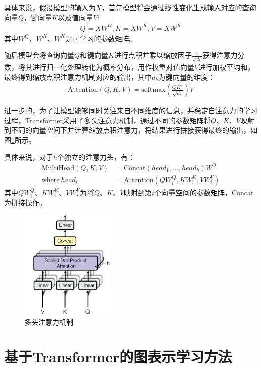 具体来说，假设模型的输入为$X$，首先模型将会通过线性变化生成输入对应的查询向量$Q$，键向量$K$以及值向量$V$:
\begin{gather}
    Q=XW^Q, K=XW^K, V=XW^K
\end{gather}
其中$W^Q$、$W^K$、$W^K$是可学习的参数矩阵。

随后模型会将查询向量$Q$和键向量$K$进行点积并乘以缩放因子$\frac{1}{\sqrt{d_k}}$获得注意力分数，将其进行归一化处理转化为概率分布，用作权重对值向量$V$进行加权平均和，最终得到缩放点积注意力机制对应的输出，其中$d_k$为键向量的维度：
\begin{gather}
    \mbox{Attention}(Q,K,V) = \mbox{softmax}(\frac{QK^T}{\sqrt{d_k}})V
\end{gather}


进一步的，为了让模型能够同时关注来自不同维度的信息，并稳定自注意力的学习过程，Transformer采用了多头注意力机制，通过不同的参数矩阵将$Q$、$K$、$V$映射到不同的向量空间下并计算缩放点积注意力，将结果进行拼接获得最终的输出，如图\ref{MultiHeadAttention}所示。

具体来说，对于$h$个独立的注意力头，有：
\begin{equation}
  \begin{aligned}
    \mbox{MultiHead}(Q,K,V)&=\mbox{Concat}(head_1,...,head_h)W^O\\
    \mbox{where} \  head_i &=\mbox{Attention}(QW^Q_i,KW^K_i,VW^V_i)
  \end{aligned}
\end{equation}
其中$QW^Q_i$、$KW^K_i$、$VW^V_i$为将$Q$、$K$、$V$映射到第$i$个向量空间的参数矩阵，Concat为拼接操作。

\begin{figure}[htbp]
  \centerline{\includegraphics[width=0.4\textwidth]{pic/MultiHeadAttention.png}}
  \caption{多头注意力机制}
  \label{MultiHeadAttention}
\end{figure}
\section{基于Transformer的图表示学习方法}


